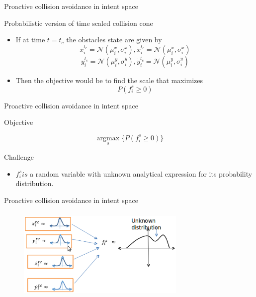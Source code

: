 \documentclass{beamer}
\begin{document}
\begin{frame}{Proactive collision avoidance in intent space}
\begin{block}{Probabilistic version of time scaled collision cone}
\begin{itemize}


\item{If at time $t=t_c$ the obstacles state are given by }
$$x_i^{t_c} = \mathcal{N}(\mu_i^{x},\sigma_i^{x}), \dot{x}_i^{t_c} = \mathcal{N}(\mu_i^{\dot{x}},\sigma_i^{\dot{x}})$$
$$y_i^{t_c} = \mathcal{N}(\mu_i^{y},\sigma_i^{y}), \dot{y}_i^{t_c} = \mathcal{N}(\mu_i^{\dot{y}},\sigma_i^{\dot{y}})$$
\item{Then the objective would be to find the scale that maximizes}
$$P(f_i^s \geq 0)$$ 
\end{itemize} 
\end{block}
\end{frame}
\begin{frame}{Proactive collision avoidance in intent space}
\begin{block}{Objective}

$$\underset{s}{\operatorname{argmax}}\{P(f_i^s \geq 0)\}$$ 

\end{block}
\begin{block}{Challenge}
\begin{itemize}


\item{$f_i^s is$ a random variable with unknown analytical  expression for its probability
 distribution.}
 \end{itemize} 
\end{block}
\end{frame}
\begin{frame}{Proactive collision avoidance in intent space}
\begin{figure}
\includegraphics[width= 8.1cm, height=4.5cm]{fig8.eps}
\end{figure}

\end{frame}
\end{document}
